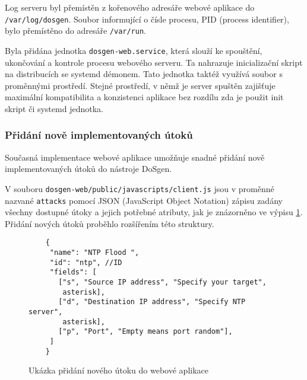 Log serveru byl přemístěn z kořenového adresáře webové aplikace do \newline \texttt{/var/log/dosgen}. Soubor informující o čísle procesu, PID (process identifier), bylo přemístěno do adresáře \texttt{/var/run}.

Byla přidána jednotka \texttt{dosgen-web.service}, která slouží ke spouštění, ukončování a kontrole procesu webového serveru. Ta nahrazuje inicializační skript na distribucích se systemd démonem. Tato jednotka taktéž využívá soubor s proměnnými prostředí. Stejné prostředí, v němž je server spuštěn zajišťuje maximální kompatibilita a konzistenci aplikace bez rozdílu zda je použit init skript či systemd jednotka.

\subsubsection{Přidání nově implementovaných útoků}
Současná implementace webové aplikace umožňuje snadné přidání nově implementovaných útoků do nástroje DoSgen.

V souboru \texttt{dosgen-web/public/javascripts/client.js} jsou v proměnné nazvané \texttt{attacks} pomocí JSON (JavaScript Object Notation) zápisu zadány všechny dostupné útoky a jejich potřebné atributy, jak je znázorněno ve výpisu \ref{fig:dosgen-web-attack-json}. Přidání nových útoků proběhlo rozšířením této struktury.


\begin{figure} [ht]
	\centering
	\begin{lstlisting}
	{
     "name": "NTP Flood ",
     "id": "ntp", //ID
     "fields": [
       ["s", "Source IP address", "Specify your target",
        asterisk],
       ["d", "Destination IP address", "Specify NTP server",
        asterisk],
       ["p", "Port", "Empty means port random"],
     ]
	}	
	\end{lstlisting}
	\caption{Ukázka přidání nového útoku do webové aplikace}
	\label{fig:dosgen-web-attack-json}
\end{figure}
